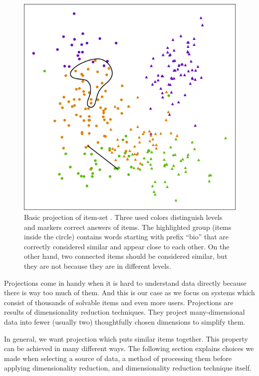 \documentclass[
  printed, %
  table,   %
  nolof,     %
  nolot,     %
  color,
  final,
  nocover
]{fithesis3}
\begin{document}
\begin{figure}
    \includegraphics[width=\textwidth]{img/common_projection}
  \caption{Basic projection of item-set \cviceniB{}. Three used colors distinguish levels and markers correct answers of items. The highlighted group (items inside the circle) contains words starting with prefix ``bio'' that are correctly considered similar and appear close to each other. On the other hand, two connected items should be considered similar, but they are not because they are in different levels.}
  \label{fig:common_projection}
\end{figure}


Projections come in handy when it is hard to understand data directly because there is way too much of them. And this is our case as we focus on systems which consist of thousands of solvable items and even more users. Projections are results of dimensionality reduction techniques. They project many-dimensional data into fewer (usually two) thoughtfully chosen dimensions to simplify them.


In general, we want projection which puts similar items together. This property can be achieved in many different ways. The following section explains choices we made when selecting a source of data, a method of processing them before applying dimensionality reduction, and dimensionality reduction technique itself.
\end{document}
